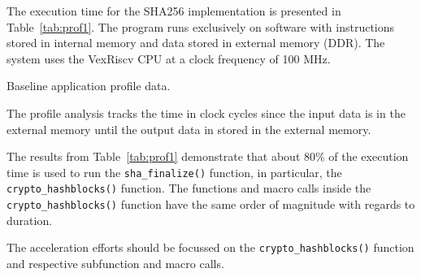 The execution time for the SHA256 implementation \cite{iob-soc-sha} is
presented in Table~\ref{tab:prof1}. The program runs exclusively on software
with instructions stored in internal memory and data stored in external memory
(DDR). The system uses the VexRiscv CPU \cite{iob-vexriscv} at a clock
frequency of 100 MHz.

\begin{table}[h]
    \centering
    
    \caption{Baseline application profile data.}
    \label{tab:prof1}
\end{table}

The profile analysis tracks the time in clock cycles since the input data is in
the external memory until the output data in stored in the external memory.

The results from Table~\ref{tab:prof1} demonstrate that about 80\% of the
execution time is used to run the \texttt{sha\_finalize()} function, in
particular, the \texttt{crypto\_hashblocks()} function. The functions and macro
calls inside the \texttt{crypto\_hashblocks()} function have the same order of
magnitude with regards to duration.

The acceleration efforts should be focussed on the
\texttt{crypto\_hashblocks()} function and respective subfunction and macro
calls.


